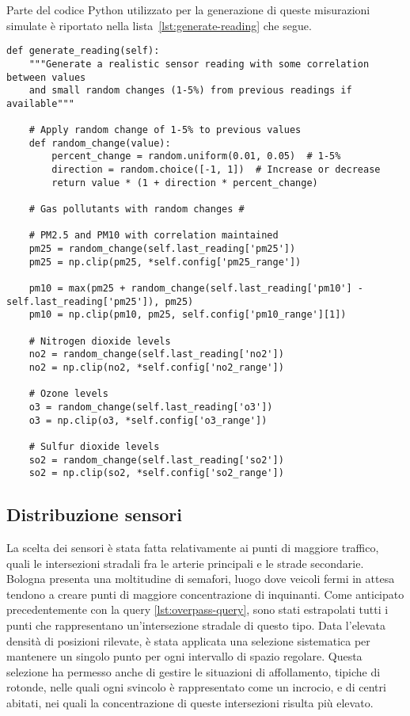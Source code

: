 Parte del codice Python utilizzato per la generazione di queste misurazioni simulate è riportato
nella lista~\ref{lst:generate-reading} che segue.

\begin{lstlisting}[caption={Metodo per la generazione di pseudo-misurazioni}, label=lst:generate-reading]
  def generate_reading(self):
    """Generate a realistic sensor reading with some correlation between values
    and small random changes (1-5%) from previous readings if available"""

    # Apply random change of 1-5% to previous values
    def random_change(value):
        percent_change = random.uniform(0.01, 0.05)  # 1-5%
        direction = random.choice([-1, 1])  # Increase or decrease
        return value * (1 + direction * percent_change)

    # Gas pollutants with random changes #

    # PM2.5 and PM10 with correlation maintained
    pm25 = random_change(self.last_reading['pm25'])
    pm25 = np.clip(pm25, *self.config['pm25_range'])

    pm10 = max(pm25 + random_change(self.last_reading['pm10'] - self.last_reading['pm25']), pm25)
    pm10 = np.clip(pm10, pm25, self.config['pm10_range'][1])

    # Nitrogen dioxide levels
    no2 = random_change(self.last_reading['no2'])
    no2 = np.clip(no2, *self.config['no2_range'])

    # Ozone levels
    o3 = random_change(self.last_reading['o3'])
    o3 = np.clip(o3, *self.config['o3_range'])

    # Sulfur dioxide levels
    so2 = random_change(self.last_reading['so2'])
    so2 = np.clip(so2, *self.config['so2_range'])
\end{lstlisting}

\subsection{Distribuzione sensori}
\label{subsection:sensor-distribution}

La scelta dei sensori è stata fatta relativamente ai punti di maggiore traffico, quali le intersezioni stradali
fra le arterie principali e le strade secondarie. Bologna presenta una moltitudine di semafori, luogo dove veicoli
fermi in attesa tendono a creare punti di maggiore concentrazione di inquinanti. Come anticipato precedentemente
con la query \ref{lst:overpass-query}, sono stati estrapolati tutti i punti che rappresentano un'intersezione
stradale di questo tipo. Data l'elevata densità di posizioni rilevate, è stata applicata una selezione sistematica
per mantenere un singolo punto per ogni intervallo di spazio regolare.
Questa selezione ha permesso anche di gestire le situazioni di affollamento, tipiche di rotonde,
nelle quali ogni svincolo è rappresentato come un incrocio, e di centri abitati, nei quali la concentrazione
di queste intersezioni risulta più elevato.

